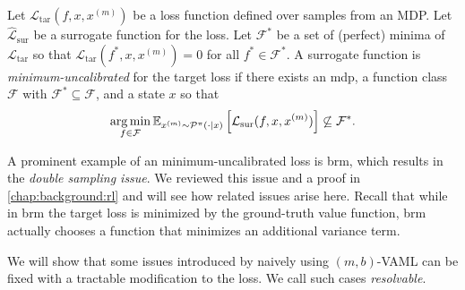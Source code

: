 \begin{definition}
    Let $\mathcal{L}_\mathrm{tar}(f,x,x^{(m)})$ be a loss function defined over samples from an MDP.
    Let $\hat{\mathcal{L}}_\mathrm{sur}$ be a surrogate function for the loss.
    Let $\mathcal{F}^*$ be a set of (perfect) minima of $\mathcal{L}_\mathrm{tar}$ so that $\mathcal{L}_\mathrm{tar}(f^*,x,x^{(m)}) = 0$ for all $f^* \in \mathcal{F}^*.$
    A surrogate function is \emph{minimum-uncalibrated} for the target loss if there exists an \ac{mdp}, a function class $\mathcal{F}$ with $\mathcal{F}^* \subseteq \mathcal{F}$, and a state $x$ so that 
    $$\operatorname*{arg\,min}_{f \in \mathcal{F}} \mathbb{E}_{x^{(m)}\sim\mathcal{P}^\pi(\cdot|x)}\left[\mathcal{L}_\mathrm{sur}(f,x,x^{(m)})\right] \not\subseteq \mathcal{F}^*.$$
\end{definition}
A prominent example of an minimum-uncalibrated loss is \ac{brm}, which results in the \emph{double sampling issue}.
We reviewed this issue and a proof in \autoref{chap:background:rl} and will see how related issues arise here.
Recall that while in \ac{brm} the target loss is minimized by the ground-truth value function, \ac{brm} actually chooses a function that minimizes an additional variance term.

We will show that some issues introduced by naively using $(m,b)$-VAML can be fixed with a tractable modification to the loss.
We call such cases \emph{resolvable}.


